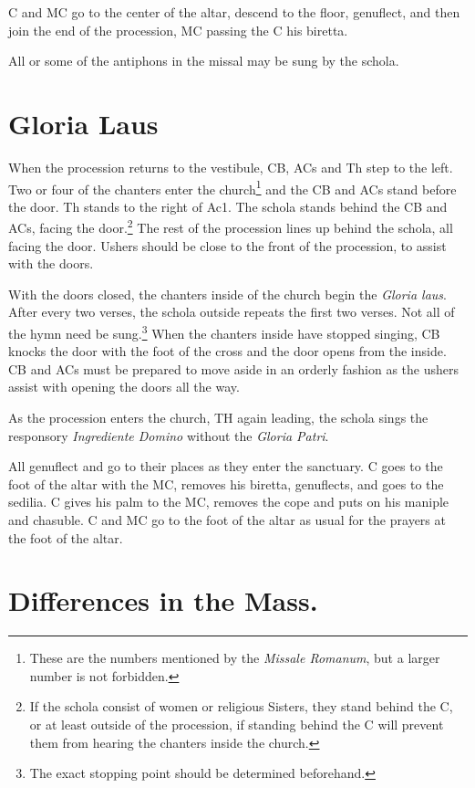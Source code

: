 {	\rubric C and MC go to the center of the altar, descend to the floor,
	genuflect, and then join the end of the procession, MC passing the C his
	biretta.

	\rubric All or some of the antiphons in the missal may be sung by the
	schola.

	\section{Gloria Laus}

	\rubric When the procession returns to the vestibule, CB, ACs and Th step
	to the left. Two or four of the chanters enter the church\footnote{These
		are the numbers mentioned by the \textit{Missale Romanum}, but a larger
	number is not forbidden.} and the CB and ACs stand before the door. Th stands
	to the right of Ac1. The schola stands behind the CB and ACs, facing the
	door.\footnote{If the schola consist of women or religious Sisters, they stand
		behind the C, or at least outside of the procession, if standing behind the
	C will prevent them from hearing the chanters inside the church.} The rest of
	the procession lines up behind the schola, all facing the door. Ushers should
	be close to the front of the procession, to assist with the doors.

	\rubric With the doors closed, the chanters inside of the church begin the
	\textit{Gloria laus}. After every two verses, the schola outside repeats
	the first two verses. Not all of the hymn need be sung.\footnote{The exact
	stopping point should be determined beforehand.} When the chanters inside
	have stopped singing, CB knocks the door with the foot of the cross and the
	door opens from the inside. CB and ACs must be prepared to move aside in an
	orderly fashion as the ushers assist with opening the doors all the way.

	\rubric As the procession enters the church, TH again leading, the schola
	sings the responsory \textit{Ingrediente Domino} without the \textit{Gloria
	Patri}.

	\rubric All genuflect and go to their places as they enter the sanctuary. C
	goes to the foot of the altar with the MC, removes his biretta, genuflects,
	and goes to the sedilia. C gives his palm to the MC, removes the cope and
	puts on his maniple and chasuble. C and MC go to the foot of the altar as
	usual for the prayers at the foot of the altar.

	\section{Differences in the Mass.}

}
